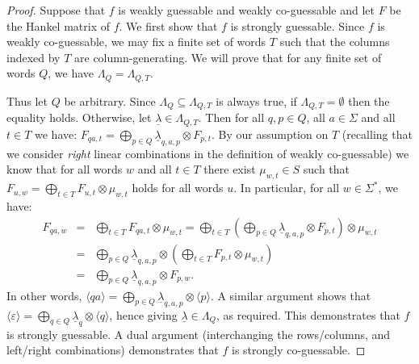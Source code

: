 \documentclass{lmcs}
\numberwithin{theorem}{section}
\begin{document}
\begin{proof}
	Suppose that $f$ is weakly guessable and weakly co-guessable and let $F$ be the Hankel matrix of $f$. We first show that $f$ is strongly guessable. Since $f$ is weakly co-guessable, we may fix a  finite set of words $T$ such that the columns indexed by $T$ are column-generating. We will prove that for any finite set of words $Q$, we have $\Lambda_{Q} = \Lambda_{Q,T}$.
	
	Thus let $Q$ be arbitrary. Since $\Lambda_{Q} \subseteq \Lambda_{Q,T}$ is always true, if $\Lambda_{Q,T} = \emptyset$ then the equality holds. Otherwise, let $\underline{\lambda} \in \Lambda_{Q, T}$. Then for all $q, p \in Q$, all $a \in \Sigma$ and all $t \in T$ we have:
	$F_{qa,t} = \bigoplus_{p \in Q} \underline{\lambda}_{q,a,p} \otimes F_{p,t}$. By our assumption on $T$ (recalling that we consider \emph{right} linear combinations in the definition of weakly co-guessable) we know that for all words $w$ and all $t \in T$ there exist $\mu_{w,t} \in S$ such that $F_{u, w} = \bigoplus_{t \in T} F_{u, t} \otimes \mu_{w,t}$ holds for all words $u$. In particular, for all $w \in \Sigma^*$, we have:
	\begin{eqnarray*}
		F_{qa, w} &=& \bigoplus_{t \in T} F_{qa, t} \otimes \mu_{w,t} = \bigoplus_{t \in T} (\bigoplus_{p \in Q} \underline{\lambda}_{q,a,p} \otimes F_{p, t}) \otimes \mu_{w,t} \\
		&=& \bigoplus_{p \in Q} \underline{\lambda}_{q,a,p} \otimes (\bigoplus_{t \in T}  F_{p, t}\otimes \mu_{w,t})\\
		&=& \bigoplus_{p \in Q}\underline{\lambda}_{q,a,p} \otimes F_{p, w}.
	\end{eqnarray*}
	In other words, $\langle qa \rangle = \bigoplus_{p \in Q}\underline{\lambda}_{q,a,p} \otimes \langle p \rangle$. A similar argument shows that $\langle \varepsilon \rangle = \bigoplus_{q \in Q}\underline{\lambda}_{q} \otimes \langle q \rangle$, hence giving $\underline{\lambda} \in \Lambda_Q$, as required. This demonstrates that $f$ is strongly guessable. A dual argument (interchanging the rows/columns, and left/right combinations) demonstrates that $f$ is strongly co-guessable.
\end{proof}
\end{document}
